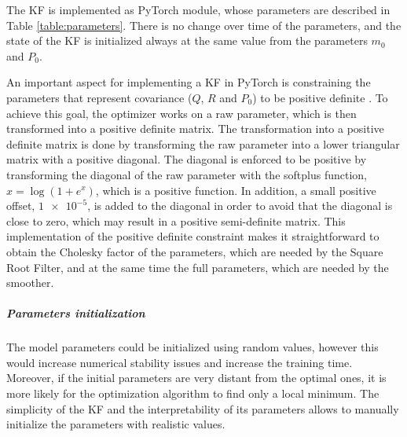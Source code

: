 \documentclass{article}
\begin{document}
The KF is implemented as \textsf{PyTorch} module, whose parameters are described in Table \ref{table:parameters}.
There is no change over time of the parameters, and the state of the KF is initialized always at the same value from the parameters $m_0$ and $P_0$.


An important aspect for implementing a KF in \textsf{PyTorch} is constraining the parameters that represent covariance ($Q$, $R$ and $P_0$) to be positive definite \cite{bishop_pattern_2006}. To achieve this goal, the optimizer works on a raw parameter, which is then transformed into a positive definite matrix.
The transformation into a positive definite matrix is done by transforming the raw parameter into a lower triangular matrix with a positive diagonal. The diagonal is enforced to be positive by transforming the diagonal of the raw parameter with the softplus function, $x = \log (1 + e^{x})$, which is a positive function. In addition, a small positive offset, $\num{1e-5}$, is added to the diagonal in order to avoid that the diagonal is close to zero, which may result in a positive semi-definite matrix. This implementation of the positive definite constraint makes it straightforward to obtain the Cholesky factor of the parameters, which are needed by the Square Root Filter, and at the same time the full parameters, which are needed by the smoother.

\subparagraph{Parameters initialization}

The model parameters could be initialized using random values, however this would increase numerical stability issues and increase the training time. Moreover, if the initial parameters are very distant from the optimal ones, it is more likely for the optimization algorithm to find only a local minimum.  The simplicity of the KF and the interpretability of its parameters allows to manually initialize the parameters with realistic values.
\end{document}
